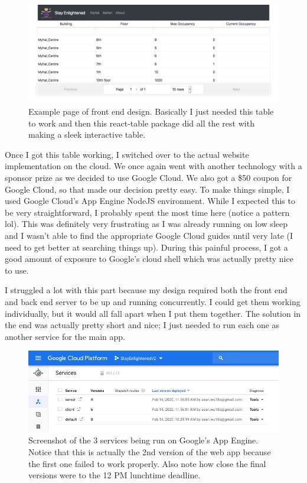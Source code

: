 \documentclass[a4paper,12pt]{gress}
\begin{document}
\begin{figure}[H]
  \begin{center}
  \includegraphics[width=150mm, scale=0.2]{pictures/client.png}
  \caption{Example page of front end design. Basically I just needed this table to work and then this react-table package did all the rest with making a sleek interactive table.}
  \end{center}
\end{figure}

Once I got this table working, I switched over to the actual website implementation on the cloud. We once again went with another technology with a sponsor prize as we decided to use Google Cloud. We also got a \$50 coupon for Google Cloud, so that made our decision pretty easy. To make things simple, I used Google Cloud's App Engine NodeJS environment. While I expected this to be very straightforward, I probably spent the most time here (notice a pattern lol). This was definitely very frustrating as I was already running on low sleep and I wasn't able to find the appropriate Google Cloud guides until very late (I need to get better at searching things up). During this painful process, I got a good amount of exposure to Google's cloud shell which was actually pretty nice to use.

I struggled a lot with this part because my design required both the front end and back end server to be up and running concurrently. I could get them working individually, but it would all fall apart when I put them together. The solution in the end was actually pretty short and nice; I just needed to run each one as another service for the main app.


\begin{figure}[H]
  \begin{center}
  \includegraphics[width=150mm, scale=0.2]{pictures/gcp-app.png}
  \caption{Screenshot of the 3 services being run on Google's App Engine. Notice that this is actually the 2nd version of the web app because the first one failed to work properly. Also note how close the final versions were to the 12 PM lunchtime deadline.}
  \end{center}
\end{figure}
\end{document}
